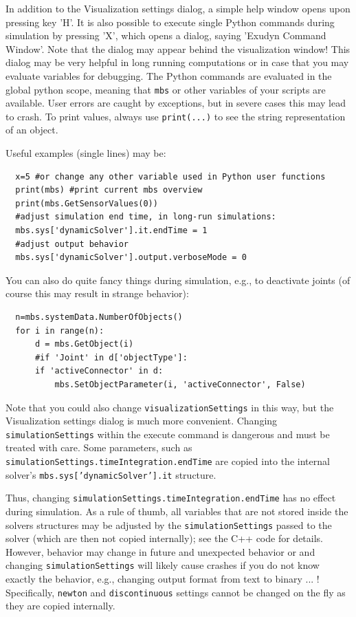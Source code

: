 %
In addition to the Visualization settings dialog, a simple help window opens upon pressing key 'H'. 
It is also possible to execute single Python commands during simulation by pressing 'X', which opens a dialog, saying 'Exudyn Command Window'. 
Note that the dialog may appear behind the visualization window!
This dialog may be very helpful in long running computations or in case that you may evaluate variables for debugging.
The Python commands are evaluated in the global python scope, meaning that \texttt{mbs} or other variables of your scripts are available.
User errors are caught by exceptions, but in severe cases this may lead to crash.
To print values, always use \texttt{print(...)} to see the string representation of an object.

\noindent Useful examples (single lines) may be: 
\pythonstyle\begin{lstlisting}
  x=5 #or change any other variable used in Python user functions
  print(mbs) #print current mbs overview
  print(mbs.GetSensorValues(0))
  #adjust simulation end time, in long-run simulations:
  mbs.sys['dynamicSolver'].it.endTime = 1 
  #adjust output behavior
  mbs.sys['dynamicSolver'].output.verboseMode = 0
\end{lstlisting}

\noindent You can also do quite fancy things during simulation, e.g., to deactivate joints (of course this may result in strange behavior):
\pythonstyle\begin{lstlisting}
  n=mbs.systemData.NumberOfObjects()
  for i in range(n):
      d = mbs.GetObject(i)
      #if 'Joint' in d['objectType']:
      if 'activeConnector' in d:
          mbs.SetObjectParameter(i, 'activeConnector', False)
\end{lstlisting}


Note that you could also change \texttt{visualizationSettings} in this way, but the Visualization settings dialog is much more convenient.
Changing \texttt{simulationSettings} within the execute command is dangerous and must be treated with care.
Some parameters, such as \texttt{simulationSettings.timeIntegration.endTime} are copied into the internal solver's \texttt{mbs.sys['dynamicSolver'].it} structure.

Thus, changing \texttt{simulationSettings.timeIntegration.endTime} has no effect during simulation. 
As a rule of thumb, all variables that are not stored inside the solvers structures may be adjusted by the \texttt{simulationSettings} passed to the solver (which are then not copied internally); see the C++ code for details. However, behavior may change in future and unexpected behavior or and changing \texttt{simulationSettings} will likely cause crashes if you do not know exactly the behavior, e.g., changing output format from text to binary ... !
Specifically, \texttt{newton} and \texttt{discontinuous} settings cannot be changed on the fly as they are copied internally.

